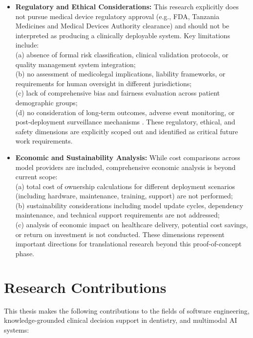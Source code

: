 \documentclass[12pt,a4paper]{report}
\begin{document}
\begin{itemize}
		\item \textbf{Regulatory and Ethical Considerations:} This research explicitly does not pursue medical device regulatory approval (e.g., FDA, Tanzania Medicines and Medical Devices Authority clearance) and should not be interpreted as producing a clinically deployable system. Key limitations include: \\
		(a) absence of formal risk classification, clinical validation protocols, or quality management system integration; \\
		(b) no assessment of medicolegal implications, liability frameworks, or requirements for human oversight in different jurisdictions; \\
		(c) lack of comprehensive bias and fairness evaluation across patient demographic groups; \\
		(d) no consideration of long-term outcomes, adverse event monitoring, or post-deployment surveillance mechanisms \cite{schwendicke2022ai_global,schwendicke2020artificial}. These regulatory, ethical, and safety dimensions are explicitly scoped out and identified as critical future work requirements.
		
		\item \textbf{Economic and Sustainability Analysis:} While cost comparisons across model providers are included, comprehensive economic analysis is beyond current scope: \\
		(a) total cost of ownership calculations for different deployment scenarios (including hardware, maintenance, training, support) are not performed; \\
		(b) sustainability considerations including model update cycles, dependency maintenance, and technical support requirements are not addressed; \\
		(c) analysis of economic impact on healthcare delivery, potential cost savings, or return on investment is not conducted. These dimensions represent important directions for translational research beyond this proof-of-concept phase.
		
	\end{itemize}
	
	
	\section{Research Contributions}
	This thesis makes the following contributions to the fields of software engineering, knowledge-grounded clinical decision support in dentistry, and multimodal AI systems:
	
\end{document}
